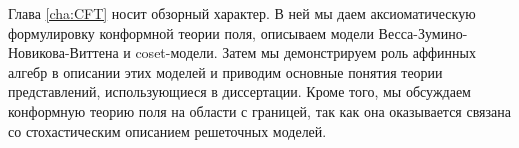 \intro

%
%





\actualitysection
\actualitytext


 \noveltysection
 \noveltytext


\resultssection
\resultstext

\approbationsection
\approbationtext

\pubsection
\pubtext


\structsection
\structtext


Глава \ref{cha:CFT} носит обзорный характер. В ней мы даем аксиоматическую формулировку конформной теории поля, описываем модели Весса-Зумино-Новикова-Виттена и coset-модели. Затем мы демонстрируем роль аффинных алгебр в описании этих моделей и приводим основные понятия теории представлений, использующиеся в диссертации. Кроме того, мы обсуждаем конформную теорию поля на области с границей, так как она оказывается связана со стохастическим описанием решеточных моделей. 

